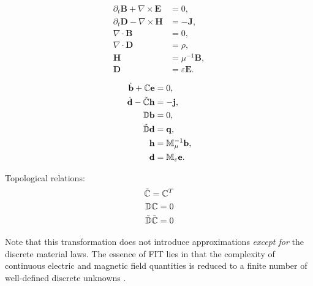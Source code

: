 \documentclass{article}
\begin{document}
\begin{minipage}{0.3\textwidth}
\begin{align*}
    \partial_t \mathbf{B} + \nabla \times \mathbf{E} &= 0, \\
    \partial_t \mathbf{D} - \nabla \times \mathbf{H} &= -\mathbf{J}, \\
    \nabla \cdot \mathbf{B} &= 0,  \\
    \nabla \cdot \mathbf{D} &= \rho, \\
    \mathbf{H} &= \mu^{-1} \mathbf{B}, \\
    \mathbf{D} &= \varepsilon \mathbf{E}. 
\end{align*}
\end{minipage}
\begin{minipage}{0.1\textwidth}
\centering
{}
\end{minipage}
\begin{minipage}{0.3\textwidth}
\begin{align*}
    \dot{\mathbf{b}} + \mathbb{C}\mathbf{e} &= 0 , \\
    \dot{\mathbf{d}} - \Tilde{\mathbb{C}}\mathbf{h} &= - \mathbf{j}, \\
    \mathbb{D}\mathbf{b} &= 0,  \\
    \Tilde{\mathbb{D}}\mathbf{d} &= \mathbf{q},  \\
    \mathbf{h} &= \mathbb{M}_\mu^{-1} \mathbf{b}, \\
    \mathbf{d} &= \mathbb{M}_{\varepsilon} \mathbf{e}. 
\end{align*}
\end{minipage}
\begin{minipage}{0.2\textwidth}
Topological relations:
\begin{align*}
    \Tilde{\mathbb{C}} = \mathbb{C}^T \\
    \mathbb{D}\mathbb{C} = 0 \\
    \Tilde{\mathbb{D}}\Tilde{\mathbb{C}} = 0
\end{align*}
\end{minipage}

\hfill

Note that this transformation does not introduce approximations \emph{except for} the discrete material laws. The essence of FIT lies in that the complexity of continuous electric and magnetic field quantities
is reduced to a finite number of well-defined discrete unknowns \citep{weiland_2003}.
\end{document}
